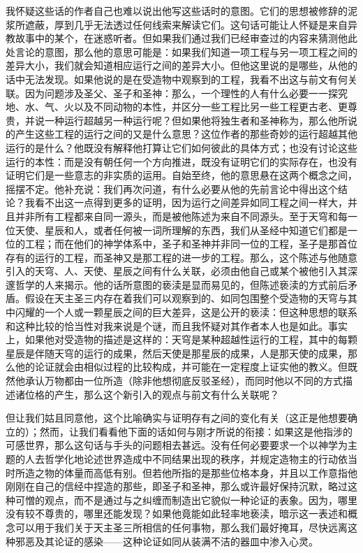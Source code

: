 我怀疑这些话的作者自己也难以说出他写这些话时的意图。它们的思想被修辞的泥浆所遮蔽，厚到几乎无法透过任何线索来解读它们。这句话可能让人怀疑是来自异教故事中的某个，在迷惑听者。但如果我们通过我们已经审查过的内容来猜测他此处言论的意图，那么他的意思可能是：如果我们知道一项工程与另一项工程之间的差异大小，我们就会知道相应运行之间的差异大小。但他这里说的是哪些，从他的话中无法发现。如果他说的是在受造物中观察到的工程，我看不出这与前文有何关联。因为问题涉及圣父、圣子和圣神：那么，一个理性的人有什么必要一一探究地、水、气、火以及不同动物的本性，并区分一些工程比另一些工程更古老、更尊贵，并说一种运行超越另一种运行呢？但如果他将独生者和圣神称为，那么他所说的产生这些工程的运行之间的又是什么意思？这位作者的那些奇妙的运行超越其他运行的是什么？他既没有解释他打算让它们如何彼此的具体方式；也没有讨论这些运行的本性：而是没有朝任何一个方向推进，既没有证明它们的实际存在，也没有证明它们是一些意志的非实质的运用。自始至终，他的意思悬在这两个概念之间，摇摆不定。他补充说：我们再次问道，有什么必要从他的先前言论中得出这个结论？我看不出这一点得到更多的证明，因为运行之间差异如同工程之间一样大，并且并非所有工程都来自同一源头，而是被他陈述为来自不同源头。至于天穹和每一位天使、星辰和人，或者任何被一词所理解的东西，我们从圣经中知道它们都是一位的工程；而在他们的神学体系中，圣子和圣神并非同一位的工程，圣子是那首位存有的运行的工程，而圣神又是那工程的进一步的工程。那么，这个陈述与他随意引入的天穹、人、天使、星辰之间有什么关联，必须由他自己或某个被他引入其深邃哲学的人来揭示。他的话所意图的亵渎是显而易见的，但陈述亵渎的方式前后矛盾。假设在天主圣三内存在着我们可以观察到的、如同包围整个受造物的天穹与其中闪耀的一个人或一颗星辰之间的巨大差异，这是公开的亵渎：但这种思想的联系和这种比较的恰当性对我来说是个谜，而且我怀疑对其作者本人也是如此。事实上，如果他对受造物的描述是这样的：天穹是某种超越性运行的工程，其中的每颗星辰是伴随天穹的运行的成果，然后天使是那星辰的成果，人是那天使的成果，那么他的论证就会由相似过程的比较构成，并可能在一定程度上证实他的教义。但既然他承认万物都由一位所造（除非他想彻底反驳圣经），而同时他以不同的方式描述诸位格的产生，那么这个新引入的观点与前文有什么关联呢？\par

但让我们姑且同意他，这个比喻确实与证明存有之间的变化有关（这正是他想要确立的）；然而，让我们看看他下面的话如何与刚才所说的衔接：如果这是他指涉的可感世界，那么这句话与手头的问题相去甚远。没有任何必要要求一个以神学为主题的人去哲学化地论述世界造成中不同结果出现的秩序，并规定造物主的行动依当时所造之物的体量而高低有别。但若他所指的是那些位格本身，并且以工作意指他刚刚在自己的信经中捏造的那些，即圣子和圣神，那么或许最好保持沉默，略过这种可憎的观点，而不是通过与之纠缠而制造出它貌似一种论证的表象。因为，哪里没有较不尊贵的，哪里还能发现？如果他竟能如此轻率地亵渎，暗示这一表述和概念可以用于我们关于天主圣三所相信的任何事物，那么我们最好掩耳，尽快远离这种邪恶及其论证的感染——这种论证如同从装满不洁的器皿中渗入心灵。\par

